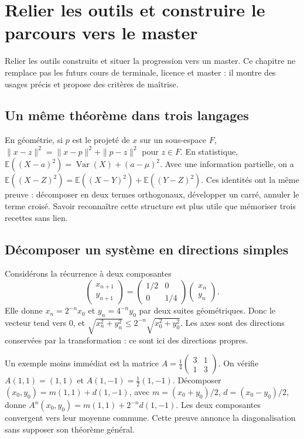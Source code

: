 \documentclass[../cours_1re.tex]{subfiles}
\begin{document}
\setcounter{chapter}{29}
\chapter{Relier les outils et construire le parcours vers le master}
\label{ch:30}
\begin{objectif}
Relier les outils construits et situer la progression vers un master.
Ce chapitre ne remplace pas les futurs cours de terminale, licence et master :
il montre des usages précis et propose des critères de maîtrise.
\end{objectif}
\section{Un même théorème dans trois langages}
En géométrie, si $p$ est le projeté de $x$ sur un sous-espace $F$,
$\|x-z\|^2=\|x-p\|^2+\|p-z\|^2$ pour $z\in F$.
En statistique, $\mathbb E((X-a)^2)=\operatorname{Var}(X)+(a-\mu)^2$.
Avec une information partielle, on a
$\mathbb E((X-Z)^2)=\mathbb E((X-Y)^2)+\mathbb E((Y-Z)^2)$.
Ces identités ont la même preuve : décomposer en deux termes orthogonaux,
développer un carré, annuler le terme croisé.
Savoir reconnaître cette structure est plus utile que mémoriser
trois recettes sans lien.

\section{Décomposer un système en directions simples}
Considérons la récurrence à deux composantes
\[
\begin{pmatrix}x_{n+1}\\y_{n+1}\end{pmatrix}
=
\begin{pmatrix}1/2&0\\0&1/4\end{pmatrix}
\begin{pmatrix}x_n\\y_n\end{pmatrix}.
\]
Elle donne $x_n=2^{-n}x_0$ et $y_n=4^{-n}y_0$ par deux suites géométriques.
Donc le vecteur tend vers $0$, et
$\sqrt{x_n^2+y_n^2}\le2^{-n}\sqrt{x_0^2+y_0^2}$.
Les axes sont des directions conservées par la transformation :
ce sont ici des directions propres.

Un exemple moins immédiat est la matrice
$A=\frac14\begin{pmatrix}3&1\\1&3\end{pmatrix}$.
On vérifie $A(1,1)=(1,1)$ et $A(1,-1)=\frac12(1,-1)$.
Décomposer $(x_0,y_0)=m(1,1)+d(1,-1)$, avec
$m=(x_0+y_0)/2$, $d=(x_0-y_0)/2$, donne
$A^n(x_0,y_0)=m(1,1)+2^{-n}d(1,-1)$.
Les deux composantes convergent vers leur moyenne commune.
Cette preuve annonce la diagonalisation sans supposer son théorème général.
\end{document}
